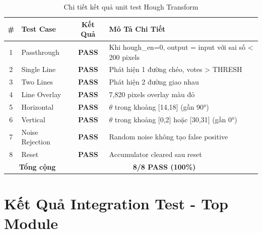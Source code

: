 \documentclass[12pt,a4paper]{report}
\begin{document}
\begin{table}[H]
\centering
\caption{Chi tiết kết quả unit test Hough Transform}
\label{tab:unit_test}
\begin{tabular}{|c|l|c|p{6cm}|}
\hline
\textbf{\#} & \textbf{Test Case} & \textbf{Kết Quả} & \textbf{Mô Tả Chi Tiết} \\
\hline
1 & Passthrough & \cellcolor{passgreen!30}\textbf{PASS} & Khi hough\_en=0, output = input với sai số < 200 pixels \\
\hline
2 & Single Line & \cellcolor{passgreen!30}\textbf{PASS} & Phát hiện 1 đường chéo, votes > THRESH \\
\hline
3 & Two Lines & \cellcolor{passgreen!30}\textbf{PASS} & Phát hiện 2 đường giao nhau \\
\hline
4 & Line Overlay & \cellcolor{passgreen!30}\textbf{PASS} & 7,820 pixels overlay màu đỏ \\
\hline
5 & Horizontal & \cellcolor{passgreen!30}\textbf{PASS} & $\theta$ trong khoảng [14,18] (gần 90°) \\
\hline
6 & Vertical & \cellcolor{passgreen!30}\textbf{PASS} & $\theta$ trong khoảng [0,2] hoặc [30,31] (gần 0°) \\
\hline
7 & Noise Rejection & \cellcolor{passgreen!30}\textbf{PASS} & Random noise không tạo false positive \\
\hline
8 & Reset & \cellcolor{passgreen!30}\textbf{PASS} & Accumulator cleared sau reset \\
\hline
\multicolumn{2}{|c|}{\textbf{Tổng cộng}} & \multicolumn{2}{c|}{\textbf{8/8 PASS (100\%)}} \\
\hline
\end{tabular}
\end{table}

\section{Kết Quả Integration Test - Top Module}
\end{document}
